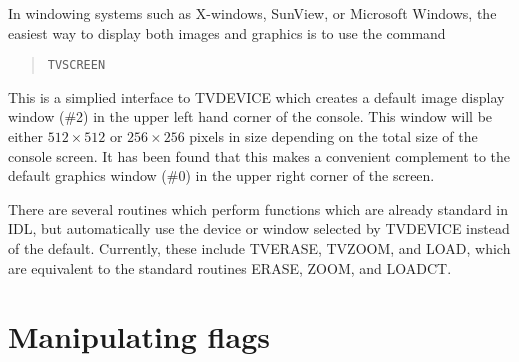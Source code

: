 In windowing systems such as X-windows, SunView, or Microsoft Windows, the
easiest way to display both images and graphics is to use the command
\begin{quote}
\begin{verbatim}
TVSCREEN
\end{verbatim}
\end{quote}
This is a simplied interface to TVDEVICE which creates a default image display
window (\#2) in the upper left hand corner of the console.  This window will be
either \mbox{$512 \times 512$} or \mbox{$256 \times 256$} pixels in size
depending on the total size of the console screen.  It has been found that this
makes a convenient complement to the default graphics window (\#0) in the upper
right corner of the screen.

There are several routines which perform functions which are already standard
in IDL, but automatically use the device or window selected by TVDEVICE instead
of the default.  Currently, these include TVERASE, TVZOOM, and LOAD, which are
equivalent to the standard routines ERASE, ZOOM, and LOADCT.

\section{Manipulating flags}
\label{flags}

